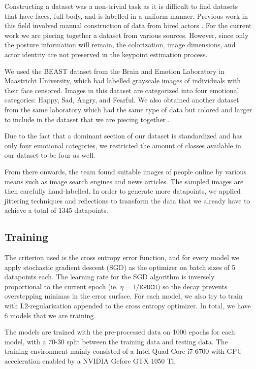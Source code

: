 \documentclass{article}
\begin{document}
Constructing a dataset was a non-trivial task as it is difficult to find datasets that have faces, full body, and is labelled in a uniform manner. Previous work in this field involved manual construction of data from hired actors \citep{schindler2008recognizing}. For the current work we are piecing together a dataset from various sources. However, since only the posture information will remain, the colorization, image dimensions, and actor identity are not preserved in the keypoint estimation process.

We used the BEAST dataset \citep{de2011bodily} from the Brain and Emotion Laboratory in Maastricht University, which had labelled grayscale images of individuals with their face censored. Images in this dataset are categorized into four emotional categories: Happy, Sad, Angry, and Fearful. We also obtained another dataset from the same laboratory which had the same type of data but colored and larger to include in the dataset that we are piecing together \citep{stienen2012computational}.

Due to the fact that a dominant section of our dataset is standardized and has only four emotional categories, we restricted the amount of classes available in our dataset to be four as well.

From there onwards, the team found suitable images of people online by various means such as image search engines and news articles. The sampled images are then carefully hand-labelled. In order to generate more datapoints, we applied jittering techniques and reflections to transform the data that we already have to achieve a total of 1345 datapoints.

\subsection{Training}

The criterion used is the cross entropy error function, and for every model we apply stochastic gradient descent (SGD) as the optimizer on batch sizes of 5 datapoints each. The learning rate for the SGD algorithm is inversely proportional to the current epoch (ie. $\eta = 1/\mathtt{EPOCH}$) so the decay prevents overstepping minimas in the error surface. For each model, we also try to train with L2-regularization appended to the cross entropy optimizer. In total, we have 6 models that we are training.

The models are trained with the pre-processed data on 1000 epochs for each model, with a 70-30 split between the training data and testing data. The training environment mainly consisted of a Intel Quad-Core i7-6700 with GPU acceleration enabled by a NVIDIA Gefore GTX 1050 Ti.
\end{document}
